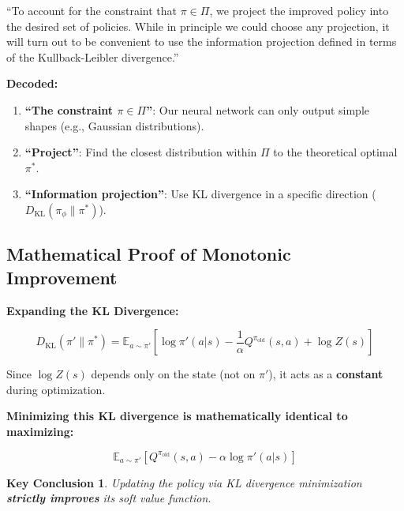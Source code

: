 \documentclass[12pt,a4paper]{article}
\theoremstyle{noteplain}
\newtheorem{important}{Key Conclusion}[section]
\theoremstyle{noteexercise}
\begin{document}
\begin{keypoint}
``To account for the constraint that $\pi \in \Pi$, we project the improved policy into the desired set of policies. While in principle we could choose any projection, it will turn out to be convenient to use the information projection defined in terms of the Kullback-Leibler divergence.''

\textbf{Decoded:}

\begin{enumerate}
  \item \textbf{``The constraint $\pi \in \Pi$''}: Our neural network can only output simple shapes (e.g., Gaussian distributions).
  \item \textbf{``Project''}: Find the closest distribution within $\Pi$ to the theoretical optimal $\pi^*$.
  \item \textbf{``Information projection''}: Use KL divergence in a specific direction ($D_{\text{KL}}(\pi_\phi \| \pi^*)$).
\end{enumerate}

\end{keypoint}



\subsection{Mathematical Proof of Monotonic Improvement}\label{ssec:monotonic}



\textbf{Expanding the KL Divergence:}

$$D_{\text{KL}}(\pi' \| \pi^*) = \mathbb{E}_{a \sim \pi'}\left[\log\pi'(a|s) - \frac{1}{\alpha}Q^{\pi_{\text{old}}}(s,a) + \log Z(s)\right]$$

Since $\log Z(s)$ depends only on the state (not on $\pi'$), it acts as a \textbf{constant} during optimization.

\textbf{Minimizing this KL divergence is mathematically identical to maximizing:}

$$\mathbb{E}_{a \sim \pi'}\left[Q^{\pi_{\text{old}}}(s,a) - \alpha \log\pi'(a|s)\right]$$

\begin{important}
Updating the policy via KL divergence minimization \textbf{strictly improves} its soft value function.
\end{important}



\end{document}
